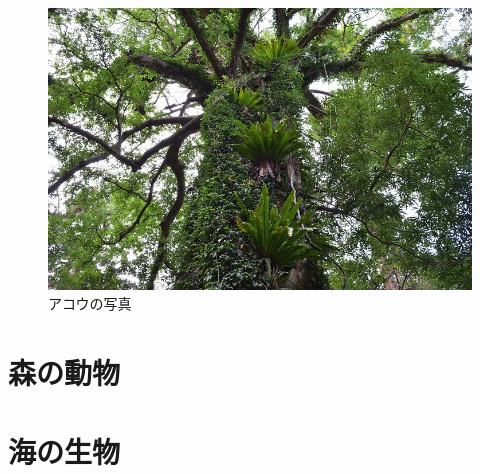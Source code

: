 \documentclass[10pt,titlepage,a5paper]{ltjsbook}
\begin{document}
    \hfill
    \begin{minipage}{0.38\columnwidth}
      \begin{figure}[H]
            \centering
            \includegraphics[width=\columnwidth]{akou.jpg}
            \caption{アコウの写真}
            \label{fig:akou_photo}
        \end{figure}
    \end{minipage}
\section{森の動物}
\section{海の生物}
\end{document}
